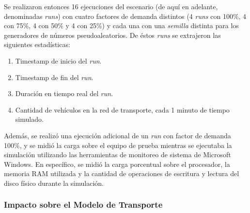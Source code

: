 Se realizaron entonces 16 ejecuciones del escenario (de aquí en adelante, denominadas \emph{runs}) con cuatro factores de demanda distintos (4 \emph{runs} con 100\%, 4 con 75\%, 4 con 50\% y 4 con 25\%) y cada una con una \emph{semilla} distinta para los generadores de números pseudoaleatorios. De éstos \emph{runs} se extrajeron las siguientes estadísticas:

\begin{enumerate}
    \item Timestamp de inicio del \emph{run}.
    \item Timestamp de fin del \emph{run}.
    \item Duración en tiempo real del \emph{run}.
    \item Cantidad de vehículos en la red de transporte, cada 1 minuto de tiempo simulado.
\end{enumerate}

Además, se realizó una ejecución adicional de un \emph{run} con factor de demanda 100\%, y se midió la carga sobre el equipo de prueba mientras se ejecutaba la simulación utilizando las herramientas de monitoreo de sistema de Microsoft Windows. En específico, se midió la carga porcentual sobre el procesador, la memoria RAM utilizada y la cantidad de operaciones de escritura y lectura del disco físico durante la simulación. 

\subsubsection{Impacto sobre el Modelo de Transporte}

